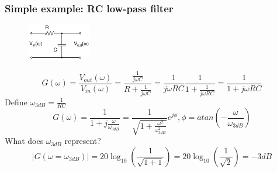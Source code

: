 \documentclass[beamer]{standalone}
\begin{document}
 
\begin{frame}
 \frametitle{Simple example: RC low-pass filter}
     \begin{figure}
      \includegraphics[width=0.25\textwidth]{./circuits/rc_low_pass.pdf}
     \end{figure}
    \[ G(\omega)
    =\frac{V_{out}(\omega)}{V_{in}(\omega)}
    = \frac{\frac{1}{j \omega C}}{R+\frac{1}{j \omega C}} 
    = \frac{1}{j \omega R C} \frac{1}{1+\frac{1}{j \omega R C}}
    = \frac{1}{1+j \omega R C}
    \]
    Define $\omega_{3dB}=\frac{1}{RC}$
    \[ G(\omega)
    = \frac{1}{1+j\frac{\omega}{\omega_{3dB}}}
    = \frac{1}{\sqrt{1+\frac{\omega^2}{\omega_{3dB}^2}}} e^{j \phi} ,
    \phi = atan (-\frac{\omega}{\omega_{3dB}})
    \]
    What does $\omega_{3dB}$ represent?
    \[
    |G(\omega=\omega_{3dB})|=20 \log_{10}\left(\frac{1}{\sqrt{1+1}}\right)
    =20 \log_{10}\left(\frac{1}{\sqrt{2}}\right)=-3 dB
    \]
\end{frame}
\end{document}
